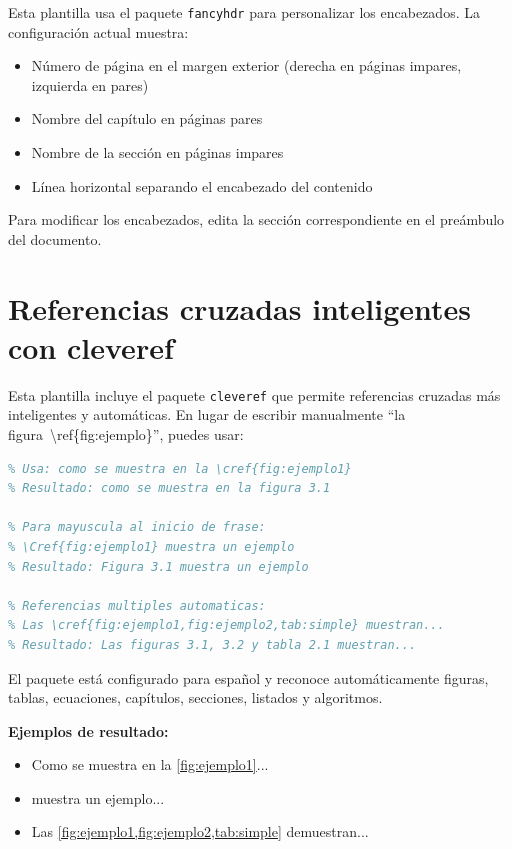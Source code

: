 \documentclass[a4paper,11pt]{report}
\begin{document}
\begin{appendices}
Esta plantilla usa el paquete \texttt{fancyhdr} para personalizar los encabezados. La configuración actual muestra:

\begin{itemize}
  \item Número de página en el margen exterior (derecha en páginas impares, izquierda en pares)
  \item Nombre del capítulo en páginas pares
  \item Nombre de la sección en páginas impares
  \item Línea horizontal separando el encabezado del contenido
\end{itemize}

Para modificar los encabezados, edita la sección correspondiente en el preámbulo del documento.

\section{Referencias cruzadas inteligentes con cleveref}

Esta plantilla incluye el paquete \texttt{cleveref} que permite referencias cruzadas más inteligentes y automáticas. En lugar de escribir manualmente ``la figura~\textbackslash ref\{fig:ejemplo\}'', puedes usar:

\begin{lstlisting}[language=TeX, caption={Ejemplos de uso de cleveref}]
% En lugar de: como se muestra en la figura~\ref{fig:ejemplo1}
% Usa: como se muestra en la \cref{fig:ejemplo1}
% Resultado: como se muestra en la figura 3.1

% Para mayuscula al inicio de frase:
% \Cref{fig:ejemplo1} muestra un ejemplo
% Resultado: Figura 3.1 muestra un ejemplo

% Referencias multiples automaticas:
% Las \cref{fig:ejemplo1,fig:ejemplo2,tab:simple} muestran...
% Resultado: Las figuras 3.1, 3.2 y tabla 2.1 muestran...
\end{lstlisting}

El paquete está configurado para español y reconoce automáticamente figuras, tablas, ecuaciones, capítulos, secciones, listados y algoritmos.

\textbf{Ejemplos de resultado:}

\begin{itemize}
  \item Como se muestra en la \cref{fig:ejemplo1}... 
  \item {} muestra un ejemplo... 
  \item Las \cref{fig:ejemplo1,fig:ejemplo2,tab:simple} demuestran...
\end{itemize}


\end{appendices}
\end{document}
